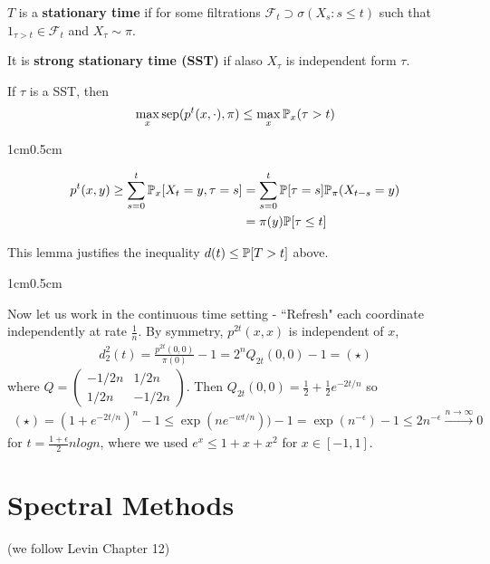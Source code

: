 \documentclass[12pt,a4paper]{article}
\newenvironment{proof}
{\begin{changemargin}{1cm}{0.5cm} 
	}%
	{\end{changemargin}
}
\begin{document}
 $T$ is a \textbf{stationary time} if for some filtrations $\mathscr{F}_t \supset \sigma(X_s:s\leq t)$ such that $1_{\tau >t} \in \mathscr{F}_t$ and $X_{\tau}\sim \pi$.

\quad It is \textbf{strong stationary time (SST)} if alaso $X_{\tau}$ is independent form $\tau$.
\s

\lem If $\tau$ is a SST, then
\begin{align*}
\max_x \text{sep}(p^t(x,\cdot), \pi) \leq \max_x \mathbb{P}_x (\tau >t)
\end{align*}
\begin{proof}
\pf \begin{align*}
p^t(x,y) \geq \sum_{s=0}^t \mathbb{P}_x [X_t =y, \tau=s] &= \sum_{s=0}^t \mathbb{P}[\tau =s] \mathbb{P}_{\pi}(X_{t-s}= y) \\
& = \pi(y) \mathbb{P}[\tau \leq t]
\end{align*}
\eop
\end{proof}
\s

This lemma justifies the inequality $d(t)\leq \mathbb{P}[T>t]$ above.
\s

\begin{proof}
Now let us work in the continuous time setting - ``Refresh" each coordinate independently at rate $\frac{1}{n}$. By symmetry, $p^{2t}(x,x)$ is independent of $x$,
\begin{align*}
d_2^2(t) = \frac{p^{2t}(0,0)}{\pi(0) }-1 = 2^n Q_{2t}(0,0)-1 = (\star)
\end{align*}
where $Q = \begin{pmatrix}
-1/2n & 1/2n \\
1/2n & -1/2n
\end{pmatrix}$. Then $Q_{2t}(0,0) = \frac{1}{2} + \frac{1}{2} e^{-2t/n}$ so
\begin{align*}
(\star) = (1+ e^{-2t/n})^n -1 \leq \exp(ne^{-wt/n})) -1 = \exp(n^{-\epsilon})-1 \leq 2n^{-\epsilon} \xrightarrow{n\rightarrow \infty} 0
\end{align*}
for $t = \frac{1+\epsilon}{2} nlog n$, where we used $e^x \leq 1+x + x^2$ for $x\in[-1,1]$.
\end{proof}
\s

\section{Spectral Methods}
(we follow Levin Chapter 12)
\s
\end{document}
